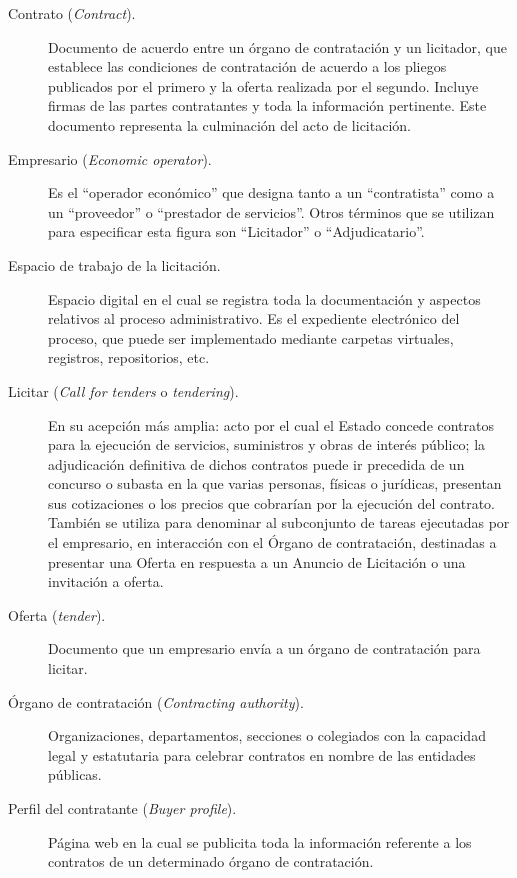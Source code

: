 \begin{description}
\item [Contrato (\textit{Contract}).] Documento de acuerdo entre un órgano de contratación y un licitador, que 
establece las condiciones de contratación de acuerdo a los pliegos publicados por el primero
y la oferta realizada por el segundo. Incluye firmas de las partes contratantes y toda la información
pertinente. Este documento representa la culminación del acto de licitación.

\item [Empresario (\textit{Economic operator}).] Es el ``operador económico'' que designa tanto a un ``contratista''
como a un ``proveedor'' o ``prestador de servicios''. Otros términos que se utilizan
para especificar esta figura son ``Licitador'' o ``Adjudicatario''.

\item [Espacio de trabajo de la licitación.] Espacio digital en el cual se registra toda
la documentación y aspectos relativos al proceso administrativo. Es el expediente electrónico
del proceso, que puede ser implementado mediante carpetas virtuales, registros, repositorios, etc.

\item [Licitar (\textit{Call for tenders} o \textit{tendering}).] En su acepción más amplia: acto por el cual el Estado concede contratos para la
ejecución de servicios, suministros y obras de interés público; la adjudicación definitiva de
dichos contratos puede ir precedida de un concurso o subasta en la que varias personas, físicas
o jurídicas, presentan sus cotizaciones o los precios que cobrarían por la ejecución del
contrato. También se utiliza para denominar al subconjunto de tareas ejecutadas por el empresario,
en interacción con el Órgano de contratación, destinadas a presentar una Oferta en respuesta
a un Anuncio de Licitación o una invitación a oferta.

\item [Oferta (\textit{tender}).] Documento que un empresario envía a
un órgano de contratación para licitar.

\item [Órgano de contratación (\textit{Contracting authority}).] Organizaciones, departamentos, secciones
o colegiados con la capacidad legal y estatutaria para celebrar
contratos en nombre de las entidades públicas.

\item [Perfil del contratante (\textit{Buyer profile}).] Página web en la cual se publicita toda la información
referente a los contratos de un determinado órgano de contratación.


\end{description}
